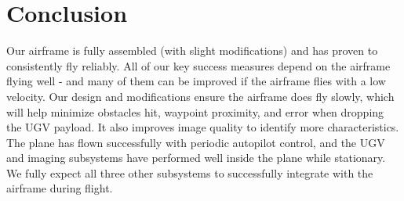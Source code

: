 \documentclass[]{auvsi_doc}
\begin{document}
\section{Conclusion}
Our airframe is fully assembled (with slight modifications) and has proven to consistently fly reliably. All of our key success measures depend on the airframe flying well - and many of them can be improved if the airframe flies with a low velocity. Our design and modifications ensure the airframe does fly slowly, which will help minimize obstacles hit, waypoint proximity, and error when dropping the UGV payload. It also improves image quality to identify more characteristics. The plane has flown successfully with periodic autopilot control, and the UGV and imaging subsystems have performed well inside the plane while stationary. We fully expect all three other subsystems to successfully integrate with the airframe during flight.
\end{document}
